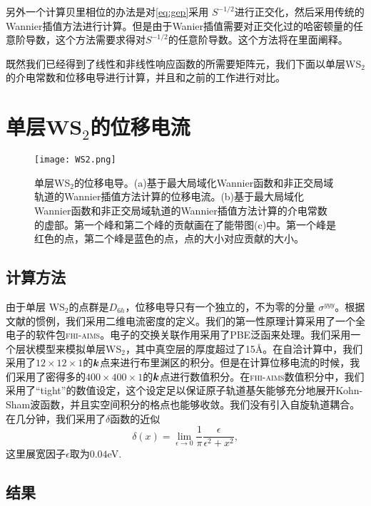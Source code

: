 另外一个计算贝里相位的办法是对\ref{eq:gep}采用 $S^{-1/2}$进行正交化，然后采用传统的Wannier插值方法进行计算。但是由于Wanier插值需要对正交化过的哈密顿量的任意阶导数，这个方法需要求得对$S^{-1/2}$的任意阶导数。这个方法将在里面阐释。

既然我们已经得到了线性和非线性响应函数的所需要矩阵元，我们下面以单层WS$_2$的介电常数和位移电导进行计算，并且和之前的工作进行对比。

\section{单层WS$_2$的位移电流}

\begin{figure}
    \texttt{[image: WS2.png]}
    \centering
    \caption{单层WS$_2$的位移电导。(a)基于最大局域化Wannier函数和非正交局域轨道的Wannier插值方法计算的位移电流。(b)基于最大局域化Wannier函数和非正交局域轨道的Wannier插值方法计算的介电常数的虚部。第一个峰和第二个峰的贡献画在了能带图(c)中。第一个峰是红色的点，第二个峰是蓝色的点，点的大小对应贡献的大小。\label{fig:WS2}}
\end{figure}

\subsection{计算方法}

由于单层 WS$_2$的点群是$D_{6h}$，位移电导只有一个独立的，不为零的分量 $\sigma^{yyy}$\cite{bilbao,wang_first-principles_2017}。根据文献的惯例，我们采用二维电流密度的定义。我们的第一性原理计算采用了一个全电子的软件包\textsc{fhi-aims}。电子的交换关联作用采用了PBE泛函\cite{perdew_generalized_1996}来处理。我们采用一个层状模型来模拟单层WS$_2$，其中真空层的厚度超过了15\AA。在自洽计算中，我们采用了$12\times12\times1$的$\boldsymbol{k}$点来进行布里渊区的积分。但是在计算位移电流的时候，我们采用了密得多的$400\times400\times1$的$\boldsymbol{k}$点进行数值积分。在\textsc{fhi-aims}数值积分中，我们采用了“tight”的数值设定，这个设定足以保证原子轨道基矢能够充分地展开Kohn-Sham波函数，并且实空间积分的格点也能够收敛\cite{blum_ab_2009}。我们没有引入自旋轨道耦合。在几分钟，我们采用了$\delta$函数的近似
\[
\delta(x)=\lim_{\epsilon\to0}\frac{1}{\pi}\frac{\epsilon}{\epsilon^2+x^2},
\]
这里展宽因子$\epsilon$取为$0.04$eV.


\subsection{结果}

